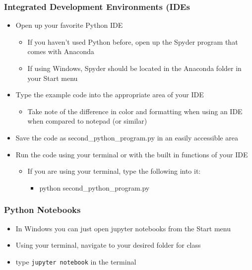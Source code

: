 \documentclass[mini frame in current subsection]{beamer}
\begin{document}
	
		\begin{frame}
			\frametitle{Integrated Development Environments (IDEs}
			\begin{itemize}
				\vfill \item  Open up your favorite Python IDE
					\begin{itemize}
						\item  If you haven't used Python before, open up the Spyder program that comes with Anaconda
						\item  If using Windows, Spyder should be located in the Anaconda folder in your Start menu
					\end{itemize}
				\vfill \item  Type the example code into the appropriate area of your IDE
					\begin{itemize}
						\item  Take note of the difference in color and formatting when using an IDE when compared to notepad (or similar)
					\end{itemize}
				\vfill \item  Save the code as second\_python\_program.py in an easily accessible area
				\vfill \item  Run the code using your terminal or with the built in functions of your IDE
					\begin{itemize}
						\item  If you are using your terminal, type the following into it:
							\begin{itemize}
								\item  python second\_python\_program.py
							\end{itemize}
					\end{itemize}
			\end{itemize}
		\end{frame}
		
	
		\begin{frame}
			\frametitle{Python Notebooks}
			\begin{itemize}
				\vfill \item  In Windows you can just open jupyter notebooks from the Start menu
				\vfill \item  Using your terminal, navigate to your desired folder for class
				\vfill \item  type \texttt{jupyter notebook} in the terminal
			\end{itemize}
		\end{frame}
	
\end{document}
